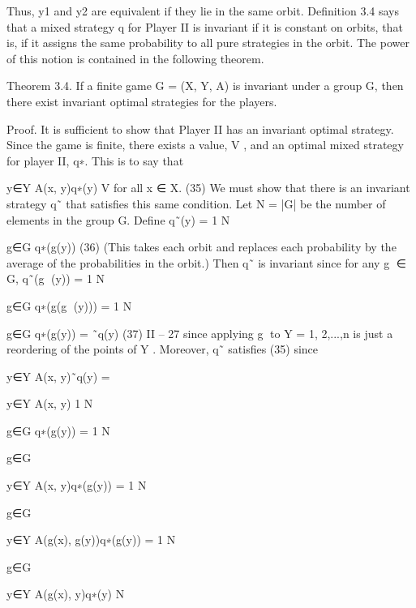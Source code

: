 \documentclass[]{report}
\begin{document}
Thus, y1 and y2 are equivalent if they lie in the same orbit. Definition 3.4 says that a mixed
strategy q for Player II is invariant if it is constant on orbits, that is, if it assigns the same
probability to all pure strategies in the orbit. The power of this notion is contained in the
following theorem.
\begin{framed}
Theorem 3.4. If a finite game G = (X, Y, A) is invariant under a group G, then there
exist invariant optimal strategies for the players.
\end{framed}
Proof. It is sufficient to show that Player II has an invariant optimal strategy. Since the
game is finite, there exists a value, V , and an optimal mixed strategy for player II, q∗.
This is to say that


y∈Y
A(x, y)q∗(y) \leq V for all x ∈ X. (35)
We must show that there is an invariant strategy q˜ that satisfies this same condition. Let
N = |G| be the number of elements in the group G. Define
q˜(y) = 1
N


g∈G
q∗(g(y)) (36)
(This takes each orbit and replaces each probability by the average of the probabilities in
the orbit.) Then q˜ is invariant since for any g ∈ G,
q˜(g
(y)) = 1
N


g∈G
q∗(g(g
(y)))
= 1
N


g∈G
q∗(g(y)) = ˜q(y)
(37)
II – 27
since applying g to Y = {1, 2,...,n} is just a reordering of the points of Y . Moreover, q˜
satisfies (35) since


y∈Y
A(x, y)˜q(y) = 

y∈Y
A(x, y) 1
N


g∈G
q∗(g(y))
= 1
N


g∈G


y∈Y
A(x, y)q∗(g(y))
= 1
N


g∈G


y∈Y
A(g(x), g(y))q∗(g(y))
= 1
N


g∈G


y∈Y
A(g(x), y)q∗(y)
N
\end{document}
